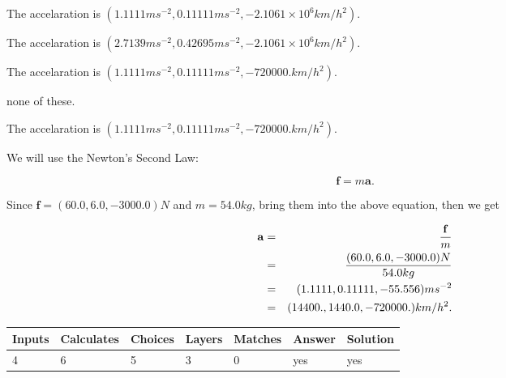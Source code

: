 \documentclass[12pt]{article}
\begin{document}
 
The accelaration is
$(
1.1111ms^{-2},
0.11111ms^{-2},
-2.1061 \times 10^{6}km/h^2
).
$
 
 
The accelaration is
$(
2.7139ms^{-2},
0.42695ms^{-2},
-2.1061 \times 10^{6}km/h^2
).
$
 
 
The accelaration is
$(
1.1111ms^{-2},
0.11111ms^{-2},
-720000.km/h^2
).
$
 
 
none of these.
 
 
\noindent{}
 
 
The accelaration is
$(
1.1111ms^{-2},
0.11111ms^{-2},
-720000.km/h^2
).
$
 
 
\noindent{}
 
 
 
 
 
 
\noindent{}
 
 

We will use the Newton's Second Law:
 
\[
\mathbf{f}=m\mathbf{a}.
\]
 
Since $\mathbf{f}=( %
60.0,  %
6.0,  %
-3000.0 )N$
and $m= %
54.0kg$, bring them into the above equation, then we get
 
\begin{eqnarray*}
\mathbf{a}&=&\frac{\mathbf{f}}m  \\
&=&\frac{(
60.0 ,
6.0 ,
-3000.0 )N
}{ %
54.0 kg}  \\
&=&(
1.1111 ,
0.11111,
-55.556
)ms^{-2} \\
&=&(
14400. ,
1440.0 ,
-720000.
)km/h^2.
\end{eqnarray*}
 
 
 
\noindent{}
 
 

 
\vspace{0.3in}
   
   
   
   
\noindent\begin{tabular}{|l|l|l|l|l|l|l|}
 \hline
Inputs & Calculates & Choices & Layers & Matches & Answer & Solution \\ \hline
           4  & 
           6  & 
           5
  & 
           3  & 
           0  & 
  yes & 
  yes 
  \\ \hline
 \end{tabular}
   
\end{document}
